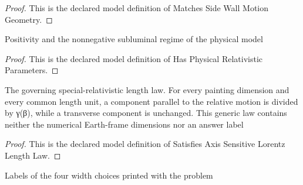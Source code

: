 \begin{proof}
  This is the declared model definition of Matches Side Wall Motion Geometry.
\end{proof}
\begin{definition}
  \label{def:physics:phyx-mini-0622:phyxminiproblems-problemphyxmini0622-hasphysicalrelativisticparameters}
  Positivity and the nonnegative subluminal regime of the physical model
\end{definition}
\begin{proof}
  This is the declared model definition of Has Physical Relativistic Parameters.
\end{proof}
\begin{definition}
  \label{def:physics:phyx-mini-0622:phyxminiproblems-problemphyxmini0622-satisfiesaxissensitivelorentzlengthlaw}
  The governing special-relativistic length law. For every painting dimension and every common length unit, a component parallel to the relative motion is divided by γ(β), while a transverse component is unchanged. This generic law contains neither the numerical Earth-frame dimensions nor an answer label
\end{definition}
\begin{proof}
  This is the declared model definition of Satisfies Axis Sensitive Lorentz Length Law.
\end{proof}
\begin{definition}
  \label{def:physics:phyx-mini-0622:phyxminiproblems-problemphyxmini0622-answerchoice}
  Labels of the four width choices printed with the problem
\end{definition}
